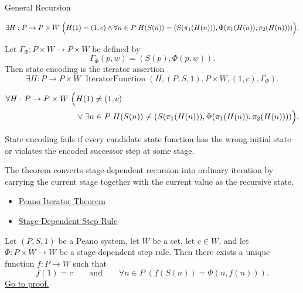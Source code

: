 \begin{topicbox}{General Recursion}
\begin{remark*}
\[
\exists H:P\to P\times W\;
\Bigl(H(1)=(1,c)\land
\forall n\in P\;
H(S(n))=(S(\pi_1(H(n))),\Phi(\pi_1(H(n)),\pi_2(H(n))))\Bigr).
\]
\end{remark*}

\begin{remark*}
Let $\Gamma_\Phi:P\times W\to P\times W$ be defined by
\[
\Gamma_\Phi(p,w)=(S(p),\Phi(p,w)).
\]
Then state encoding is the iterator assertion
\[
\exists H:P\to P\times W\;
\operatorname{IteratorFunction}(H,(P,S,1),P\times W,(1,c),\Gamma_\Phi).
\]
\end{remark*}

\begin{remark*}
\[
\begin{aligned}
\forall H:P\to P\times W\;\Bigl(&
H(1)\neq (1,c)\\
&\lor \exists n\in P\;
H(S(n))\neq(S(\pi_1(H(n))),\Phi(\pi_1(H(n)),\pi_2(H(n))))\Bigr).
\end{aligned}
\]
\end{remark*}

\begin{remark*}
State encoding fails if every candidate state function has the wrong initial
state or violates the encoded successor step at some stage.
\end{remark*}

\begin{remark*}[Interpretation]
The theorem converts stage-dependent recursion into ordinary iteration by
carrying the current stage together with the current value as the recursive
state.
\end{remark*}

\begin{remark*}[Dependencies]
\begin{itemize}
  \item \hyperref[thm:peano-iterator-theorem]{Peano Iterator Theorem}
  \item \hyperref[def:stage-dependent-step-rule]{Stage-Dependent Step Rule}
\end{itemize}
\end{remark*}

\begin{tcolorbox}[colback=thmbox, colframe=thmborder, arc=2pt,
  left=6pt, right=6pt, top=4pt, bottom=4pt,
  title={\small\textbf{Theorem (General Recursion Theorem)}},
  fonttitle=\small\bfseries]
\begin{theorem}
\label{thm:general-recursion-theorem-for-peano-system}
Let $(P,S,1)$ be a Peano system, let $W$ be a set, let $c\in W$, and let
$\Phi:P\times W\to W$ be a stage-dependent step rule. Then there exists a
unique function $f:P\to W$ such that
\[
f(1)=c
\qquad\text{and}\qquad
\forall n\in P\;(f(S(n))=\Phi(n,f(n))).
\]
\hyperref[prf:general-recursion-theorem-for-peano-system]{Go to proof.}
\end{theorem}
\end{tcolorbox}


\end{topicbox}
